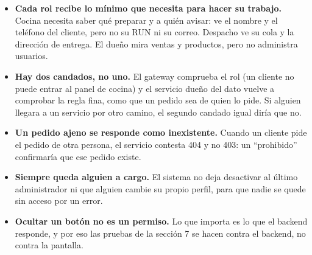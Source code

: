 \begin{itemize}[nosep,leftmargin=*]
\item \textbf{Cada rol recibe lo mínimo que necesita para hacer su trabajo.} Cocina necesita saber qué preparar y a quién avisar: ve el nombre y el teléfono del cliente, pero no su RUN ni su correo. Despacho ve su cola y la dirección de entrega. El dueño mira ventas y productos, pero no administra usuarios.
\item \textbf{Hay dos candados, no uno.} El gateway comprueba el rol (un cliente no puede entrar al panel de cocina) y el servicio dueño del dato vuelve a comprobar la regla fina, como que un pedido sea de quien lo pide. Si alguien llegara a un servicio por otro camino, el segundo candado igual diría que no.
\item \textbf{Un pedido ajeno se responde como inexistente.} Cuando un cliente pide el pedido de otra persona, el servicio contesta 404 y no 403: un “prohibido” confirmaría que ese pedido existe.
\item \textbf{Siempre queda alguien a cargo.} El sistema no deja desactivar al último administrador ni que alguien cambie su propio perfil, para que nadie se quede sin acceso por un error.
\item \textbf{Ocultar un botón no es un permiso.} Lo que importa es lo que el backend responde, y por eso las pruebas de la sección 7 se hacen contra el backend, no contra la pantalla.
\end{itemize}

